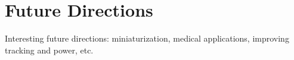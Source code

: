 \documentclass[graybox,usenames]{svmult}
\begin{document}

  

\section{Future Directions}
Interesting future directions: miniaturization, medical applications, improving tracking and power, etc.



\end{document}

